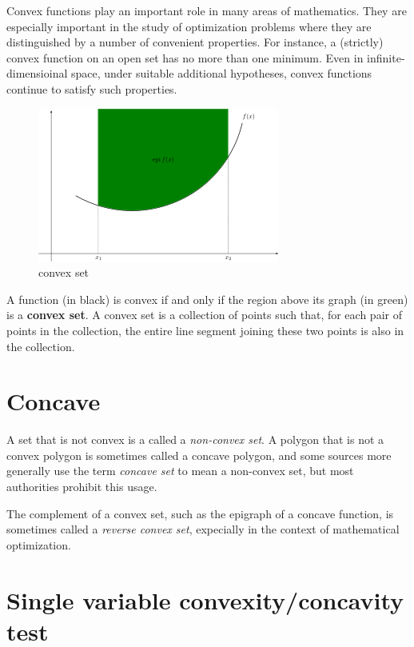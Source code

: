 \documentclass[11pt]{article}
\makeatletter
\def\maxwidth{\ifdim\Gin@nat@width>\linewidth\linewidth
    \else\Gin@nat@width\fi}
\let\Oldincludegraphics\includegraphics
\renewcommand{\includegraphics}[1]{\Oldincludegraphics[width=.8\maxwidth]{#1}}
\makeatother
\begin{document}
    Convex functions play an important role in many areas of mathematics.
They are especially important in the study of optimization problems
where they are distinguished by a number of convenient properties. For
instance, a (strictly) convex function on an open set has no more than
one minimum. Even in infinite-dimensioinal space, under suitable
additional hypotheses, convex functions continue to satisfy such
properties.

    \begin{figure}
\centering
\includegraphics{convex-set.png}
\caption{convex set}
\end{figure}

    A function (in black) is convex if and only if the region above its
graph (in green) is a \textbf{convex set}. A convex set is a collection
of points such that, for each pair of points in the collection, the
entire line segment joining these two points is also in the collection.

    \hypertarget{concave}{%
\section{Concave}\label{concave}}

    A set that is not convex is a called a \emph{non-convex set}. A polygon
that is not a convex polygon is sometimes called a concave polygon, and
some sources more generally use the term \emph{concave set} to mean a
non-convex set, but most authorities prohibit this usage.

The complement of a convex set, such as the epigraph of a concave
function, is sometimes called a \emph{reverse convex set}, expecially in
the context of mathematical optimization.

    \hypertarget{single-variable-convexityconcavity-test}{%
\section{Single variable convexity/concavity
test}\label{single-variable-convexityconcavity-test}}
\end{document}
